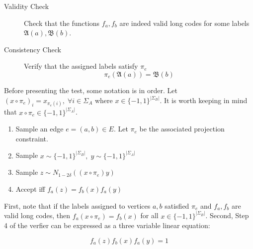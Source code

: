 \begin{description}
  \item[Validity Check] Check that the functions $f_a,f_b$ are indeed valid long codes for some labels $\mathfrak{A}(a),\mathfrak{B}(b)$.
  \item[Consistency Check] Verify that the assigned labels satisfy $\pi_e$
  \[ \pi_e(\mathfrak{A}(a)) =  \mathfrak{B}(b)\]
\end{description}

Before presenting the test, some notation is in order. Let $(x \circ \pi_e)_i = x_{\pi_e(i)}, \; \forall i \in \Sigma_A$ where $x \in \{-1,1\}^{|\Sigma_B|}$. It is worth keeping in mind that $x \circ \pi_e \in \{-1,1\}^{|\Sigma_A|}$.

\begin{enumerate}
  \item Sample an edge $e = (a,b) \in E$. Let $\pi_e$ be the associated projection constraint.

  \item Sample $x \sim \{-1,1\}^{|\Sigma_B|}, \; y \sim \{-1,1\}^{|\Sigma_A|}$
  \item Sample $z \sim N_{1 - 2\delta}((x \circ \pi_e)y)$
  \item Accept iff $f_a(z) = f_b(x)f_a(y)$
\end{enumerate}

First, note that if the labels assigned to vertices $a,b$ satisfied $\pi_e$ and $f_a,f_b$ are valid long codes, then $f_a(x \circ \pi_e) = f_b(x )$ for all $x \in \{-1,1\}^{|\Sigma_B|}$. Second, Step 4 of the verfier can be expressed as a three variable linear equation:

\begin{equation} \label{hastadpred}
 f_a(z) f_b(x)f_a(y) = 1
\end{equation}

